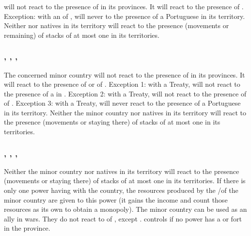 \subsubsection{}\label{chDiplo:Diplo-vijayanagar}
\aparag {} will not react to the presence of \TP in its
provinces. It will react to the presence of \COL.
\bparag Exception: with an \dipAT of \POR,  will never
to the presence of a Portuguese \COL in its territory.
\aparag Neither  nor natives in its territory will
react to the presence (movements or remaining) of stacks of at most one
\ARMY\faceplus in its territories.

\subsubsection{, , , }
\label{chDiplo:Diplo-mogol}
\label{chDiplo:Diplo-siberie}
\label{chDiplo:Diplo-soudan}
\label{chDiplo:Diplo-afghans}
\aparag The concerned minor country will not react to the presence of
\TP\facemoins in its provinces. It will react to the presence of \COL or
of \TP\faceplus.
\bparag Exception 1: with a Treaty, \paysAfghans will not react to the
presence of a \COL in \provinceHerat.
\bparag Exception 2: with a Treaty, \paysSoudan will not react to the
presence of \COL of \TUR.
\bparag Exception 3: with a Treaty, \paysMogol will never react to the
presence of a Portuguese \COL in its territory.
\aparag Neither the minor country nor natives in its territory will
react to the presence (movements or staying there) of stacks of at most
one \ARMY\faceplus in its territories.

\subsubsection{, , , \paysaceh}\label{chDiplo:Diplo-aden}\label{chDiplo:Diplo-oman}\label{chDiplo:Diplo-gujarat}\label{chDiplo:Diplo-aceh}
\aparag Neither the minor country nor natives in its territory will
react to the presence (movements or staying there) of stacks of at most
one \ARMY\faceplus in its territories.
\aparag \label{chDiplo:AdenOmanExoticResources} If there is only one
power having \dipAT with the country, the resources produced by the
\TP/\COL of the minor country are given to this power (it gains the
income and count those resources as its own to obtain a monopoly).
\aparag The minor country can be used as an ally in wars.
\aparag They do not react to \COL of \TUR, except \paysaceh.
\aparag {} controls  if no power has a \TP
or fort in the province.

